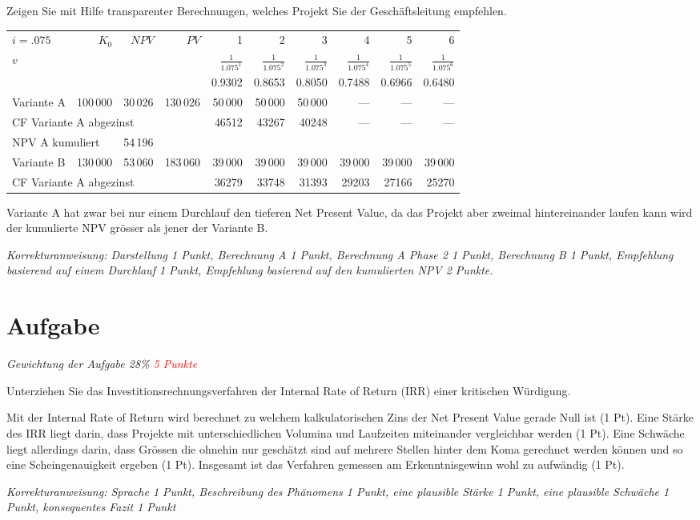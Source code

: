 \vspace{3mm}

Zeigen Sie mit Hilfe transparenter Berechnungen, welches Projekt Sie der
Geschäftsleitung empfehlen.

\color{red}
\begin{adjustwidth}{-2cm}{}
\begin{tabular}[H]{lrrrrrrrrr}
  \toprule
  $i=.075$&$K_0$&$NPV$&$PV$&1&2&3&4&5&6\\
  $v$&&&&$\frac{1}{1.075^1}$&$\frac{1}{1.075^2}$&$\frac{1}{1.075^3}$&$\frac{1}{1.075^4}$&$\frac{1}{1.075^5}$&$\frac{1}{1.075^6}$\\
  &&&&0.9302&0.8653&0.8050&0.7488&0.6966&0.6480\\
  \midrule
  Variante
  A&100\,000&30\,026&130\,026&50\,000&50\,000&50\,000&---&---&---\\
  \multicolumn{4}{l}{CF Variante A abgezinst}&46512&43267&40248&---&---&---\\
  \multicolumn{2}{l}{NPV A kumuliert}&54\,196&&&&&&&\\
  \midrule
  Variante
  B&130\,000&53\,060&183\,060&39\,000&39\,000&39\,000&39\,000&39\,000&39\,000\\
  \multicolumn{4}{l}{CF Variante A
  abgezinst}&36279&33748&31393&29203&27166&25270\\
 \bottomrule 
\end{tabular}
\end{adjustwidth}

Variante A hat zwar bei nur einem Durchlauf den tieferen Net Present
Value, da das Projekt aber zweimal hintereinander laufen kann wird der
kumulierte NPV grösser als jener der Variante B.

\itshape
Korrekturanweisung: Darstellung 1 Punkt, Berechnung A 1 Punkt, Berechnung A Phase 2 1 Punkt,
Berechnung B 1 Punkt, Empfehlung basierend auf einem Durchlauf 1 Punkt,
Empfehlung basierend auf den kumulierten NPV 2 Punkte.
\normalfont
\color{black}

\section{Aufgabe}
\textit{Gewichtung der Aufgabe 28\% \textcolor{red}{5 Punkte}}

Unterziehen Sie das Investitionsrechnungsverfahren der Internal Rate of
Return (IRR) einer kritischen Würdigung.

\color{red}
Mit der Internal Rate of Return wird berechnet zu welchem
kalkulatorischen Zins der Net Present Value gerade Null ist (1 Pt).
Eine Stärke des IRR liegt darin, dass Projekte mit unterschiedlichen
Volumina und Laufzeiten miteinander vergleichbar werden (1 Pt).
Eine Schwäche liegt allerdings darin, dass Grössen die ohnehin nur
geschätzt sind auf mehrere Stellen hinter dem Koma gerechnet werden
können und so eine Scheingenauigkeit ergeben (1 Pt).
Insgesamt ist das Verfahren gemessen am Erkenntnisgewinn wohl zu
aufwändig (1 Pt).

\itshape
Korrekturanweisung: Sprache 1 Punkt, Beschreibung des Phänomens 1 Punkt, eine plausible
Stärke 1 Punkt, eine plausible Schwäche 1 Punkt, konsequentes Fazit 1
Punkt
\normalfont


